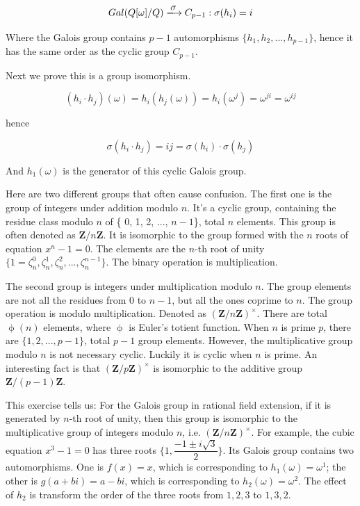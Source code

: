 \documentclass[UTF8]{article}
\begin{document}
\begin{enumerate}
\[
Gal(Q[\omega]/Q) \arrowto{\sigma} C_{p-1} :  \sigma(h_i) = i
\]

Where the Galois group contains $p-1$ automorphisms $\{h_1, h_2, ..., h_{p-1}\}$, hence it has the same order as the cyclic group $C_{p-1}$.

Next we prove this is a group isomorphism.

\[
(h_i \cdot h_j)(\omega) = h_i(h_j(\omega)) = h_i(\omega^j) = \omega^{ji} = \omega^{ij}
\]

hence

\[
\sigma(h_i \cdot h_j) = ij = \sigma(h_i) \cdot \sigma(h_j)
\]

And $h_1(\omega)$ is the generator of this cyclic Galois group.

\begin{mdframed}
Here are two different groups that often cause confusion. The first one is the group of integers under addition modulo $n$. It's a cyclic group, containing the residue class modulo $n$ of \{ 0, 1, 2, ..., $n - 1$\}, total $n$ elements. This group is often denoted as $\pmb{Z}/n\pmb{Z}$. It is isomorphic to the group formed with the $n$ roots of equation $x^n - 1 = 0$. The elements are the $n$-th root of unity $\{1 = \zeta_n^0, \zeta_n^1, \zeta_n^2, ..., \zeta_n^{n-1}\}$. The binary operation is multiplication.

\vspace{5mm}

The second group is integers under multiplication modulo $n$. The group elements are not all the residues from 0 to $n-1$, but all the ones coprime to $n$. The group operation is modulo multiplication. Denoted as $(\pmb{Z}/n\pmb{Z})^{\times}$. There are total $\upphi(n)$ elements, where $\upphi$ is Euler's totient function. When $n$ is prime $p$, there are $\{1, 2, ..., p-1\}$, total $p-1$ group elements. However, the multiplicative group modulo $n$ is not necessary cyclic. Luckily it is cyclic when $n$ is prime. An interesting fact is that $(\pmb{Z}/p\pmb{Z})^{\times}$ is isomorphic to the additive group $\pmb{Z}/(p-1)\pmb{Z}$.

\vspace{5mm}

This exercise tells us: For the Galois group in rational field extension, if it is generated by $n$-th root of unity, then this group is isomorphic to the multiplicative group of integers modulo $n$, i.e. $(\pmb{Z}/n\pmb{Z})^{\times}$. For example, the cubic equation $x^3 -1 = 0$ has three roots $\{1, \dfrac{-1 \pm i \sqrt{3}}{2}\}$. Its Galois group contains two automorphisms. One is $f(x) = x$, which is corresponding to $h_1(\omega) = \omega^1$; the other is $g(a + bi) = a - bi$, which is corresponding to $h_2(\omega) = \omega^2$. The effect of $h_2$ is transform the order of the three roots from $1, 2, 3$ to $1, 3, 2$.


\end{mdframed}
\end{enumerate}
\end{document}
